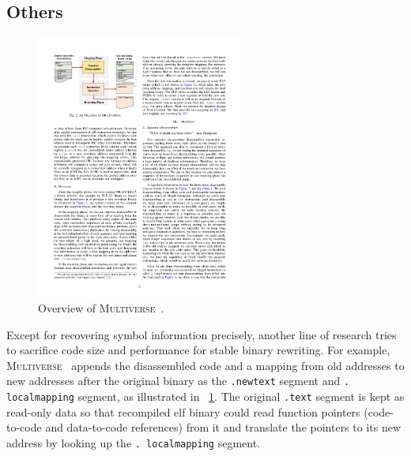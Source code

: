 \subsection{Others} \label{sec:existing-dis-others}

\begin{figure}[tb]
  \centering
  \includegraphics[width=0.6\textwidth]{fig/superset.pdf}
  \caption{Overview of \textsc{Multiverse}~\cite{bauman2018superset}.}
  \label{fig:superset}
\end{figure}

Except for recovering symbol information precisely, another line of research 
tries to sacrifice code size and performance for stable binary rewriting. For 
example, \textsc{Multiverse}~\cite{bauman2018superset,miller2019probabilistic} 
appends the disassembled code and a mapping from old addresses to new addresses 
after the original binary as the \texttt{.newtext} segment and \texttt{.
localmapping} segment, as illustrated in \F~\ref{fig:superset}. The original 
\texttt{.text} segment is kept as read-only data so that recompiled elf binary 
could read function pointers (code-to-code and data-to-code references) from it 
and translate the pointers to its new address by looking up the \texttt{.
localmapping} segment.

